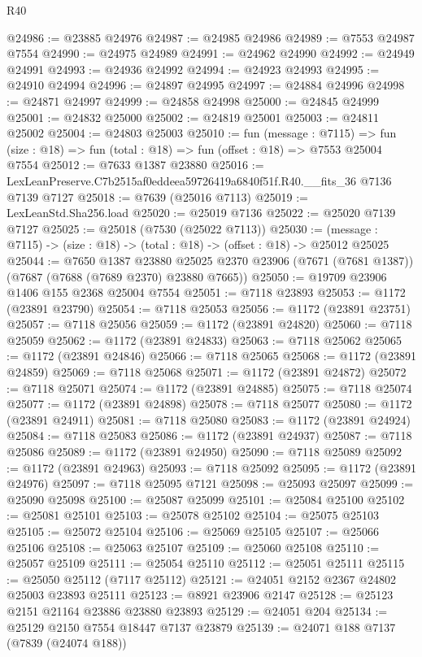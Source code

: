 \begin{lexlean}{R40}
\begin{coremodule}
@24986 := @23885 @24976
@24987 := @24985 @24986
@24989 := @7553 @24987 @7554
@24990 := @24975 @24989
@24991 := @24962 @24990
@24992 := @24949 @24991
@24993 := @24936 @24992
@24994 := @24923 @24993
@24995 := @24910 @24994
@24996 := @24897 @24995
@24997 := @24884 @24996
@24998 := @24871 @24997
@24999 := @24858 @24998
@25000 := @24845 @24999
@25001 := @24832 @25000
@25002 := @24819 @25001
@25003 := @24811 @25002
@25004 := @24803 @25003
@25010 := fun (message : @7115) =>
  fun (size : @18) => fun (total : @18) => fun (offset : @18) => @7553 @25004 @7554
@25012 := @7633 @1387 @23880
@25016 := LexLeanPreserve.C7b2515af0eddeea59726419a6840f51f.R40.__fits_36 @7136 @7139 @7127
@25018 := @7639 (@25016 @7113)
@25019 := LexLeanStd.Sha256.load
@25020 := @25019 @7136
@25022 := @25020 @7139 @7127
@25025 := @25018 (@7530 (@25022 @7113))
@25030 := (message : @7115) -> (size : @18) -> (total : @18) -> (offset : @18) -> @25012 @25025
@25044 := @7650
    @1387
    @23880
    @25025
    @2370
    @23906
    (@7671 (@7681 @1387))
    (@7687 (@7688 (@7689 @2370) @23880 @7665))
@25050 := @19709 @23906 @1406 @155 @2368 @25004 @7554
@25051 := @7118 @23893
@25053 := @1172 (@23891 @23790)
@25054 := @7118 @25053
@25056 := @1172 (@23891 @23751)
@25057 := @7118 @25056
@25059 := @1172 (@23891 @24820)
@25060 := @7118 @25059
@25062 := @1172 (@23891 @24833)
@25063 := @7118 @25062
@25065 := @1172 (@23891 @24846)
@25066 := @7118 @25065
@25068 := @1172 (@23891 @24859)
@25069 := @7118 @25068
@25071 := @1172 (@23891 @24872)
@25072 := @7118 @25071
@25074 := @1172 (@23891 @24885)
@25075 := @7118 @25074
@25077 := @1172 (@23891 @24898)
@25078 := @7118 @25077
@25080 := @1172 (@23891 @24911)
@25081 := @7118 @25080
@25083 := @1172 (@23891 @24924)
@25084 := @7118 @25083
@25086 := @1172 (@23891 @24937)
@25087 := @7118 @25086
@25089 := @1172 (@23891 @24950)
@25090 := @7118 @25089
@25092 := @1172 (@23891 @24963)
@25093 := @7118 @25092
@25095 := @1172 (@23891 @24976)
@25097 := @7118 @25095 @7121
@25098 := @25093 @25097
@25099 := @25090 @25098
@25100 := @25087 @25099
@25101 := @25084 @25100
@25102 := @25081 @25101
@25103 := @25078 @25102
@25104 := @25075 @25103
@25105 := @25072 @25104
@25106 := @25069 @25105
@25107 := @25066 @25106
@25108 := @25063 @25107
@25109 := @25060 @25108
@25110 := @25057 @25109
@25111 := @25054 @25110
@25112 := @25051 @25111
@25115 := @25050 @25112 (@7117 @25112)
@25121 := @24051 @2152 @2367 @24802 @25003 @23893 @25111
@25123 := @8921 @23906 @2147
@25128 := @25123 @2151 @21164 @23886 @23880 @23893
@25129 := @24051 @204
@25134 := @25129 @2150 @7554 @18447 @7137 @23879
@25139 := @24071 @188 @7137 (@7839 (@24074 @188))

\end{coremodule}
\end{lexlean}
